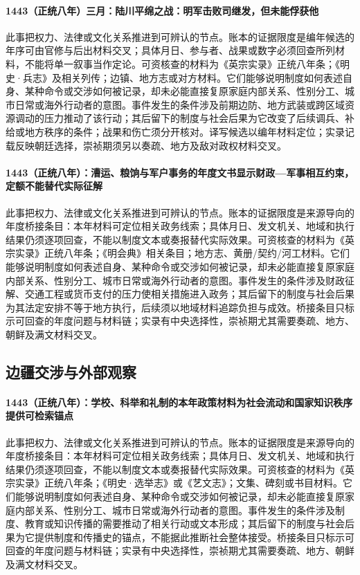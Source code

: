\paragraph{1443（正统八年）三月：陆川平绵之战：明军击败司继发，但未能俘获他} 此事把权力、法律或文化关系推进到可辨认的节点。账本的证据限度是编年候选的年序可由官修与后出材料交叉；具体月日、参与者、战果或数字必须回查所列材料，不能将单一叙事当作定论。可资核查的材料为《英宗实录》正统八年条；《明史·兵志》及相关列传；边镇、地方志或对方材料。它们能够说明制度如何表述自身、某种命令或交涉如何被记录，却未必能直接复原家庭内部关系、性别分工、城市日常或海外行动者的意图。事件发生的条件涉及前期边防、地方武装或跨区域资源调动的压力推动了该行动；其后留下的制度与社会后果为它改变了后续调兵、补给或地方秩序的条件；战果和伤亡须分开核对。译写候选以编年材料定位；实录记载反映朝廷选择，崇祯期须另以奏疏、地方及敌对政权材料交叉。

\paragraph{1443（正统八年）：漕运、粮饷与军户事务的年度文书显示财政—军事相互约束，定额不能替代实际征解} 此事把权力、法律或文化关系推进到可辨认的节点。账本的证据限度是来源导向的年度桥接条目：本年材料可定位相关政务线索；具体月日、发文机关、地域和执行结果仍须逐项回查，不能以制度文本或奏报替代实际效果。可资核查的材料为《英宗实录》正统八年条；《明会典》相关条目；地方志、黄册/契约/河工材料。它们能够说明制度如何表述自身、某种命令或交涉如何被记录，却未必能直接复原家庭内部关系、性别分工、城市日常或海外行动者的意图。事件发生的条件涉及财政征解、交通工程或货币支付的压力使相关措施进入政务；其后留下的制度与社会后果为其法定安排不等于地方执行，后续须以地域材料追踪负担与成效。桥接条目只标示可回查的年度问题与材料链；实录有中央选择性，崇祯期尤其需要奏疏、地方、朝鲜及满文材料交叉。

\subsection{边疆交涉与外部观察}

\paragraph{1443（正统八年）：学校、科举和礼制的本年政策材料为社会流动和国家知识秩序提供可检索锚点} 此事把权力、法律或文化关系推进到可辨认的节点。账本的证据限度是来源导向的年度桥接条目：本年材料可定位相关政务线索；具体月日、发文机关、地域和执行结果仍须逐项回查，不能以制度文本或奏报替代实际效果。可资核查的材料为《英宗实录》正统八年条；《明史·选举志》或《艺文志》；文集、碑刻或书目材料。它们能够说明制度如何表述自身、某种命令或交涉如何被记录，却未必能直接复原家庭内部关系、性别分工、城市日常或海外行动者的意图。事件发生的条件涉及制度、教育或知识传播的需要推动了相关行动或文本形成；其后留下的制度与社会后果为它提供制度和传播史的锚点，不能据此推断社会整体接受。桥接条目只标示可回查的年度问题与材料链；实录有中央选择性，崇祯期尤其需要奏疏、地方、朝鲜及满文材料交叉。

